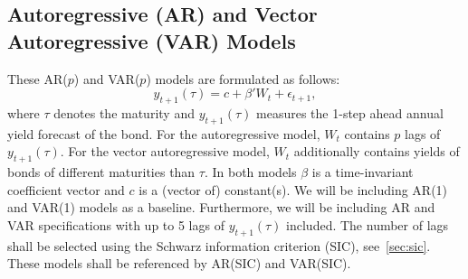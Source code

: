 \subsection{Autoregressive (AR) and Vector Autoregressive (VAR) Models}
\label{sec:arvar}
These AR($p$) and VAR($p$) models are formulated as follows:
\begin{equation}
	y_{t+1}(\tau) = c + \beta' W_t + \epsilon_{t+1},
\end{equation}
where $\tau$ denotes the maturity and $y_{t+1}(\tau)$ measures the 1-step ahead annual yield forecast of the bond. For the autoregressive model, $W_t$ contains $p$ lags of $y_{t+1}(\tau)$. For the vector autoregressive model, $W_t$ additionally contains yields of bonds of different maturities than $\tau$. In both models $\beta$ is a time-invariant coefficient vector and $c$ is a (vector of) constant(s). We will be including AR(1) and VAR(1) models as a baseline. Furthermore, we will be including AR and VAR specifications with up to 5 lags of $y_{t+1}(\tau)$ included. The number of lags shall be selected using the Schwarz information criterion (SIC), see~\cref{sec:sic}. These models shall be referenced by AR(SIC) and VAR(SIC). 

